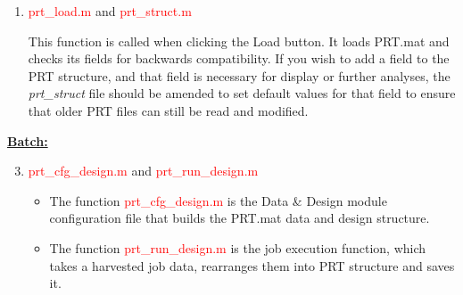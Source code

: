 \begin{enumerate}
\begin{itemize}
\begin{itemize}
\end{itemize}

\item \textcolor{red}{prt\_get\_defaults.m} and \textcolor{red}{prt\_defaults.m}

Default settings of PRoNTo are stored in \textcolor{red}{prt\_defaults.m}, including global defaults such as colour, parameters for the data and design, preprocessing, default atlas for ROI definition, arguments of different machines, and parallelization of the code. The function \textcolor{red}{prt\_get\_defaults.m} gets the relevant default values from \textcolor{red}{prt\_defaults.m} for this module. For instance, the code `color = \textcolor{red}{prt\_get\_defaults}(`color')' sets colors of backgrounds and figure parameters for Data \& Design module. \textcolor{red}{prt\_defaults.m} is constantly called by many functions in PRoNTo.

\item \textcolor{red}{prt\_data\_review.m} and \textcolor{red}{prt\_data\_review.fig}

These two functions define the GUI for reviewing the data.

\end{itemize}

\item \textcolor{red}{prt\_load.m} and \textcolor{red}{prt\_struct.m}

This function is called when clicking the Load button. It loads PRT.mat and checks its fields for backwards compatibility. If you wish to add a field to the PRT structure, and that field is necessary for display or further analyses, the \textit{prt\_struct} file should be amended to set default values for that field to ensure that older PRT files can still be read and modified. 

\end{enumerate}

\noindent \textbf{\underline{Batch:}}

\begin{enumerate}
    \setcounter{enumi}{2}

\item \textcolor{red}{prt\_cfg\_design.m} and \textcolor{red}{prt\_run\_design.m}

\begin{itemize}
\item The function \textcolor{red}{prt\_cfg\_design.m} is the Data \& Design module configuration file that builds the PRT.mat data and design structure.
\item The function \textcolor{red}{prt\_run\_design.m} is the job execution function, which takes a harvested job data, rearranges them into PRT structure and saves it.
\end{itemize}

\end{enumerate}

